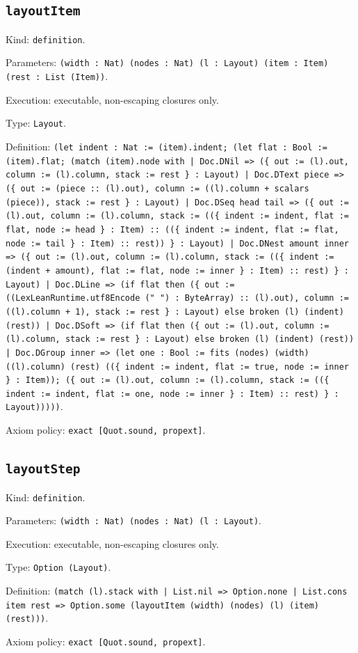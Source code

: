\documentclass[11pt]{article}
\begin{document}
\subsection*{\texttt{layoutItem}}
\noindent Kind: \texttt{definition}.\par
\noindent Parameters: \texttt{(width : Nat) (nodes : Nat) (l : Layout) (item : Item) (rest : List (Item))}.\par
\noindent Execution: executable, non-escaping closures only.\par
\noindent Type: \texttt{Layout}.\par
\noindent Definition: \texttt{(let indent : Nat := (item).indent; (let flat : Bool := (item).flat; (match (item).node with | Doc.DNil => (\{ out := (l).out, column := (l).column, stack := rest \} : Layout) | Doc.DText piece => (\{ out := (piece :: (l).out), column := ((l).column + scalars (piece)), stack := rest \} : Layout) | Doc.DSeq head tail => (\{ out := (l).out, column := (l).column, stack := ((\{ indent := indent, flat := flat, node := head \} : Item) :: ((\{ indent := indent, flat := flat, node := tail \} : Item) :: rest)) \} : Layout) | Doc.DNest amount inner => (\{ out := (l).out, column := (l).column, stack := ((\{ indent := (indent + amount), flat := flat, node := inner \} : Item) :: rest) \} : Layout) | Doc.DLine => (if flat then (\{ out := ((LexLeanRuntime.utf8Encode (" ") : ByteArray) :: (l).out), column := ((l).column + 1), stack := rest \} : Layout) else broken (l) (indent) (rest)) | Doc.DSoft => (if flat then (\{ out := (l).out, column := (l).column, stack := rest \} : Layout) else broken (l) (indent) (rest)) | Doc.DGroup inner => (let one : Bool := fits (nodes) (width) ((l).column) (rest) ((\{ indent := indent, flat := true, node := inner \} : Item)); (\{ out := (l).out, column := (l).column, stack := ((\{ indent := indent, flat := one, node := inner \} : Item) :: rest) \} : Layout)))))}.\par
\noindent Axiom policy: \texttt{exact [Quot.sound, propext]}.\par
\subsection*{\texttt{layoutStep}}
\noindent Kind: \texttt{definition}.\par
\noindent Parameters: \texttt{(width : Nat) (nodes : Nat) (l : Layout)}.\par
\noindent Execution: executable, non-escaping closures only.\par
\noindent Type: \texttt{Option (Layout)}.\par
\noindent Definition: \texttt{(match (l).stack with | List.nil => Option.none | List.cons item rest => Option.some (layoutItem (width) (nodes) (l) (item) (rest)))}.\par
\noindent Axiom policy: \texttt{exact [Quot.sound, propext]}.\par
\end{document}
